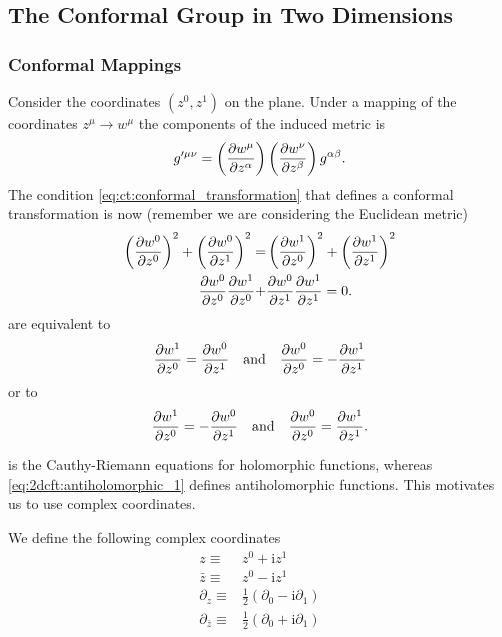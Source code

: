 \documentclass[10pt]{article}
\newcommand{\ii}{\mathrm{i}}
\begin{document}
\subsection{The Conformal Group in Two Dimensions}
\subsubsection{Conformal Mappings}
Consider the coordinates $(z^0,z^1)$ on the plane.
Under a mapping of the coordinates $z^\mu\to w^\mu$ the components of the induced metric is
\begin{align}
    g'^{\mu\nu}=\left(\pdv{w^\mu}{z^\alpha}\right)\left(\pdv{w^\nu}{z^\beta}\right)g^{\alpha\beta}.
\end{align}
The condition \cref{eq:ct:conformal_transformation} that defines a conformal transformation is now (remember we are considering the Euclidean metric)
\begin{subequations}\label{eq:2d_cft:2d_conformal_transformation_1}
    \begin{align}
        \left(\pdv{w^0}{z^0}\right)^2+\left(\pdv{w^0}{z^1}\right)^2= & \left(\pdv{w^1}{z^0}\right)^2+\left(\pdv{w^1}{z^1}\right)^2 \\
        \pdv{w^0}{z^0}\pdv{w^1}{z^0}+                                & \pdv{w^0}{z^1}\pdv{w^1}{z^1}=0.
    \end{align}
\end{subequations}
 are equivalent to
\begin{align}
    \pdv{w^1}{z^0}=\pdv{w^0}{z^1}\qand\pdv{w^0}{z^0}=-\pdv{w^1}{z^1}\label{eq:2dcft:holomorphic_1}
\end{align}
or to
\begin{align}
    \pdv{w^1}{z^0}=-\pdv{w^0}{z^1}\qand\pdv{w^0}{z^0}=\pdv{w^1}{z^1}.\label{eq:2dcft:antiholomorphic_1}
\end{align}
\begin{intu}
     is the Cauthy-Riemann equations for holomorphic functions, whereas \cref{eq:2dcft:antiholomorphic_1} defines antiholomorphic functions.
    This motivates us to use complex coordinates.
\end{intu}
We define the following complex coordinates
\begin{subequations}\label{eq:2dcft:complex_coordinates}
    \begin{align}
        z\equiv                  & z^0+\ii z^1                            \\
        \bar{z}\equiv            & z^0-\ii z^1                            \\
        \partial_z\equiv         & \frac{1}{2}(\partial_0-\ii \partial_1) \\
        \partial_{\bar{z}}\equiv & \frac{1}{2}(\partial_0+\ii\partial_1)
    \end{align}
\end{subequations}
\end{document}
